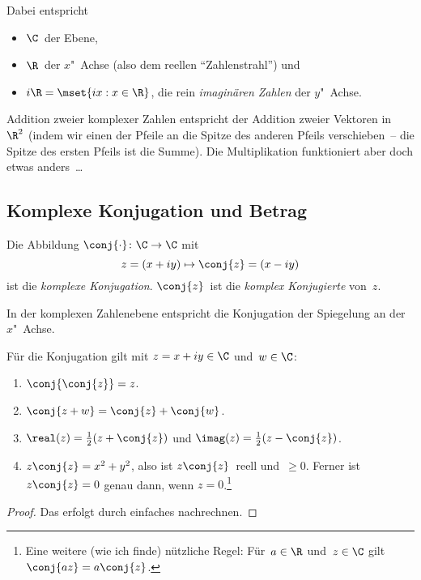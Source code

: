 \documentclass[a4paper]{article}
\begin{document}
Dabei entspricht
\begin{itemize}
    \item $\C$~der Ebene,
    \item $\R$~der $x$"~Achse (also dem reellen "`Zahlenstrahl"') und
    \item $i\R = \mset{ix : x \in \R}$, die rein \emph{imaginären Zahlen} der $y$"~Achse.
\end{itemize}
Addition zweier komplexer Zahlen entspricht der Addition zweier Vektoren in~$\R^2$ (indem wir einen der Pfeile an die Spitze des anderen Pfeils verschieben~-- die Spitze des ersten Pfeils ist die Summe). Die Multiplikation funktioniert aber doch etwas anders~\dots

\subsection{Komplexe Konjugation und Betrag}

\begin{definition}
    Die Abbildung $\conj{\cdot}\colon \C \to \C$ mit
    \begin{equation*}
        z = (x+iy) \mapsto \conj{z} = (x-iy)
    \end{equation*}
    ist die \emph{komplexe Konjugation}. $\conj{z}$~ist die \emph{komplex Konjugierte} von~$z$.
\end{definition}

In der komplexen Zahlenebene entspricht die Konjugation der Spiegelung an der $x$"~Achse.

\begin{lemma}
    Für die Konjugation gilt mit $z = x+iy \in \C$ und~$w \in \C$:
    \begin{enumerate}
        \item $\conj{\conj{z}} = z$.
        \item $\conj{z+w} = \conj{z}+\conj{w}$.
        \item $\real(z) = \frac{1}{2}(z+\conj{z})$ und $\imag(z) = \frac{1}{2}(z-\conj{z})$.
        \item $z\conj{z} = x^2+y^2$, also ist $z\conj{z}$~reell und~$\geq 0$. Ferner ist $z\conj{z} = 0$ genau dann, wenn $z = 0$.\footnote{Eine weitere (wie ich finde) nützliche Regel: Für~$a \in \R$ und~$z \in \C$ gilt $\conj{az} = a\conj{z}$.}
    \end{enumerate}
\end{lemma}

\begin{proof}
    Das erfolgt durch einfaches nachrechnen.
\end{proof}
\end{document}
